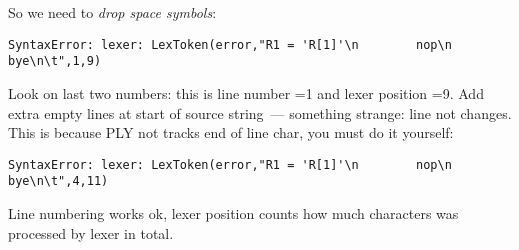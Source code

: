 So we need to \emph{drop space symbols}:

\begin{lstlisting}
SyntaxError: lexer: LexToken(error,"R1 = 'R[1]'\n        nop\n        bye\n\t",1,9)
\end{lstlisting}
Look on last two numbers: this is line number =1 and lexer position =9. Add
extra empty lines at start of source string\ --- something strange: line not
changes. This is because PLY not tracks end of line char, you must do it
yourself:

\begin{lstlisting}
SyntaxError: lexer: LexToken(error,"R1 = 'R[1]'\n        nop\n       
bye\n\t",4,11)
\end{lstlisting}
Line numbering works ok, lexer position counts how much characters was processed
by lexer in total.
